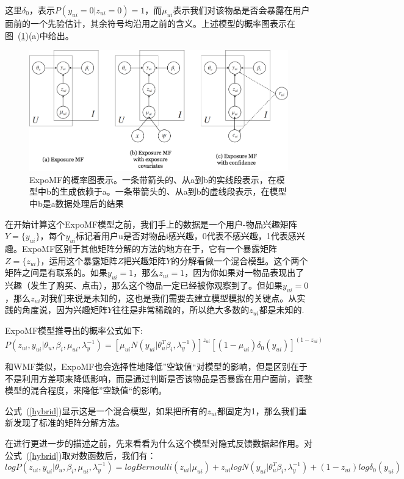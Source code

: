 \documentclass[notitlepage,cs4size,punct,oneside]{ctexrep}
\numberwithin{equation}{chapter}
\theoremstyle{mystyle}
\begin{document}
这里$\delta_0$，表示$P(y_{ui}=0|z_{ui}=0)=1$，而$\mu_{ui}$表示我们对该物品是否会暴露在用户面前的一个先验估计，其余符号均沿用之前的含义。上述模型的概率图表示在图~(\ref{figure:ExpoMF})(a)中给出。


\begin{figure}[h]
 \centering
 \includegraphics[width=\textwidth]{./equations/graph1.png}
 \caption{ExpoMF的概率图表示。一条带箭头的、从a到b的实线段表示，在模型中b的生成依赖于a。一条带箭头的、从a到b的虚线段表示，在模型中b是a数据处理后的结果}
 \label{figure:ExpoMF}
\end{figure}

\par
在开始计算这个ExpoMF模型之前，我们手上的数据是一个用户-物品兴趣矩阵$Y=\{y_{ui}\}$，每个$y_{ui}$标记着用户u是否对物品i感兴趣，0代表不感兴趣，1代表感兴趣。ExpoMF区别于其他矩阵分解的方法的地方在于，它有一个暴露矩阵$Z=\{z_{ui}\}$，运用这个暴露矩阵$Z$把兴趣矩阵$Y$的分解看做一个混合模型。这个两个矩阵之间是有联系的。如果$y_{ui}=1$，那么$z_{ui}=1$，因为你如果对一物品表现出了兴趣（发生了购买、点击），那么这个物品一定已经被你观察到了。但如果$y_{ui}=0$，那么$z_{ui}$对我们来说是未知的，这也是我们需要去建立模型模拟的关键点。从实践的角度说，因为兴趣矩阵$Y$往往是非常稀疏的，所以绝大多数的$z_{ui}$都是未知的.

\par
ExpoMF模型推导出的概率公式如下:
\begin{equation}\label{hybrid}
P(z_{ ui },y_{ ui }|\theta _{ u },\beta _{ i },\mu _{ ui },\lambda _{ y }^{ -1 })=[\mu _{ ui }N(y_{ ui }|\theta _{ u }^{ T }\beta _{ i },\lambda _{ y }^{ -1 })]^{ z_{ ui } }[(1-\mu _{ ui })\delta _{ 0 }(y_{ ui })]^{ (1-z_{ ui }) }
\end{equation}

\par
和WMF类似，ExpoMF也会选择性地降低”空缺值“对模型的影响，但是区别在于不是利用方差项来降低影响，而是通过判断是否该物品是否暴露在用户面前，调整模型的混合程度，来降低”空缺值“的影响。
\par
公式~(\ref{hybrid})显示这是一个混合模型，如果把所有的$z_{ui}$都固定为1，那么我们重新发现了标准的矩阵分解方法。
\par
在进行更进一步的描述之前，先来看看为什么这个模型对隐式反馈数据起作用。对公式~(\ref{hybrid})取对数函数后，我们有：
\begin{equation}\label{log-hybrid}
logP(z_{ ui },y_{ ui }|\theta _{ u },\beta _{ i },\mu _{ ui },\lambda _{ y }^{ -1 })=logBernoulli(z_{ui}|\mu_{ui})+z_{ui}logN(y_{ ui }|\theta _{ u }^{ T }\beta _{ i },\lambda _{ y }^{ -1 })+(1-z_{ui})log\delta _{ 0 }(y_{ ui })
\end{equation}
\end{document}
